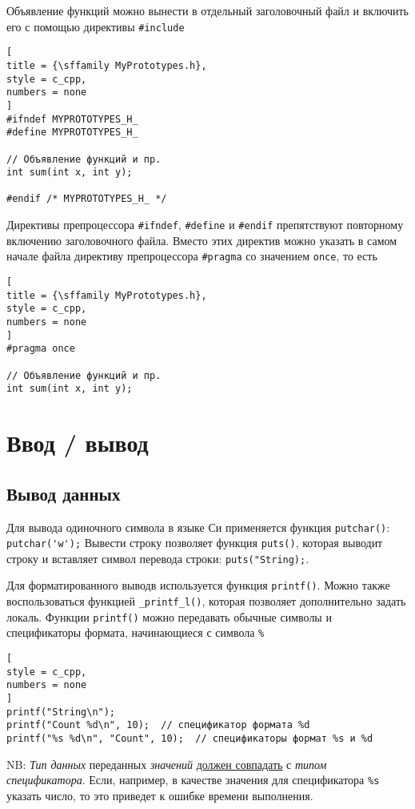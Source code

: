 \documentclass[%
	11pt,
	a4paper,
	utf8,
		]{article}
\begin{document}
Объявление функций можно вынести в отдельный заголовочный файл и включить его с помощью директивы \verb|#include|
\begin{lstlisting}[
title = {\sffamily MyPrototypes.h},
style = c_cpp,
numbers = none
]
#ifndef MYPROTOTYPES_H_
#define MYPROTOTYPES_H_

// Объявление функций и пр.
int sum(int x, int y);

#endif /* MYPROTOTYPES_H_ */
\end{lstlisting}

Директивы препроцессора \verb|#ifndef|, \verb|#define| и \verb|#endif| препятствуют повторному включению заголовочного файла. Вместо этих директив можно указать в самом начале файла директиву препроцессора \verb|#pragma| со значением \verb|once|, то есть
\begin{lstlisting}[
title = {\sffamily MyPrototypes.h},
style = c_cpp,
numbers = none
]
#pragma once

// Объявление функций и пр.
int sum(int x, int y);
\end{lstlisting}

\section{Ввод / вывод}

\subsection{Вывод данных}

Для вывода одиночного символа в языке Си применяется функция \verb*|putchar()|: \verb|putchar('w');| Вывести строку позволяет функция \verb*|puts()|, которая выводит строку и вставляет символ перевода строки: \verb|puts("String);|.

Для форматированного выводв используется функция \verb*|printf()|. Можно также воспользоваться функцией \verb|_printf_l()|, которая позволяет дополнительно задать локаль. Функции \verb*|printf()| можно передавать обычные символы и спецификаторы формата, начинающиеся с символа \verb|%|
\begin{lstlisting}[
style = c_cpp,
numbers = none	
]
printf("String\n");
printf("Count %d\n", 10);  // спецификатор формата %d
printf("%s %d\n", "Count", 10);  // спецификаторы формат %s и %d
\end{lstlisting}

NB: \emph{Тип данных} переданных \emph{значений} \underline{должен совпадать} с \emph{типом спецификатора}. Если, например, в качестве значения для спецификатора \verb*|%s| указать число, то это приведет к ошибке времени выполнения.
\end{document}
